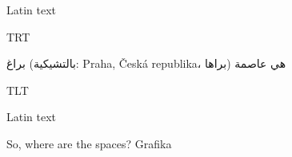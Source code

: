 \documentclass{article}
\begin{document}
\pokus

Latin text 

\pardir TRT

براغ (بالتشيكية: Praha, Česká republika، براها) هي عاصمة 

\pardir TLT

\libertine
Latin text

So, where are the \bold spaces\libertine? Grafika
\end{document}
